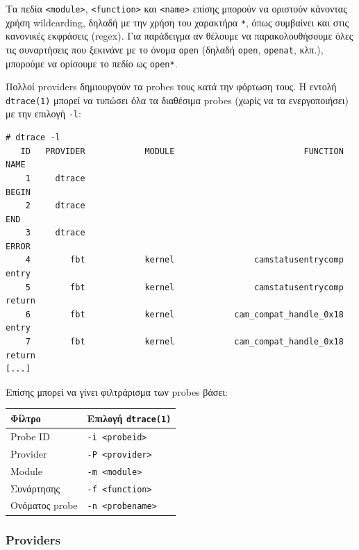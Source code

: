 \documentclass[12pt]{article}
\begin{document}
Τα πεδία \lstinline{<module>}, \lstinline{<function>} και \lstinline{<name>}
επίσης μπορούν να οριστούν κάνοντας χρήση wildcarding, δηλαδή με την χρήση του
χαρακτήρα \lstinline{*}, όπως συμβαίνει και στις κανονικές εκφράσεις (regex).
Για παράδειγμα αν θέλουμε να παρακολουθήσουμε όλες τις συναρτήσεις που ξεκινάνε
με το όνομα \lstinline{open} (δηλαδή \lstinline{open}, \lstinline{openat},
κλπ.), μπορούμε να ορίσουμε το πεδίο ως \lstinline{open*}.

Πολλοί providers δημιουργούν τα probes τους κατά την φόρτωση τους. Η εντολή
\lstinline{dtrace(1)} μπορεί να τυπώσει όλα τα διαθέσιμα probes (χωρίς να τα
ενεργοποιήσει) με την επιλογή \lstinline{-l}:

\begin{lstlisting}
# dtrace -l
   ID   PROVIDER            MODULE                          FUNCTION NAME
    1     dtrace                                                     BEGIN
    2     dtrace                                                     END
    3     dtrace                                                     ERROR
    4        fbt            kernel                camstatusentrycomp entry
    5        fbt            kernel                camstatusentrycomp return
    6        fbt            kernel            cam_compat_handle_0x18 entry
    7        fbt            kernel            cam_compat_handle_0x18 return
[...]
\end{lstlisting}

Επίσης μπορεί να γίνει φιλτράρισμα των probes βάσει:

\begin{center}
\begin{tabular}{|l|l|}
	\hline
	\textbf{Φίλτρο} & \textbf{Επιλογή \lstinline{dtrace(1)}} \\  
	\hline
	Probe ID & \lstinline{-i <probeid>} \\
	\hline
	Provider & \lstinline{-P <provider>} \\
	\hline
	Module & \lstinline{-m <module>} \\
	\hline
	Συνάρτησης & \lstinline{-f <function>} \\
	\hline
	Ονόματος probe & \lstinline{-n <probename>} \\
	\hline
\end{tabular}
\end{center}

\subsubsection{Providers} \label{providers}
\end{document}
